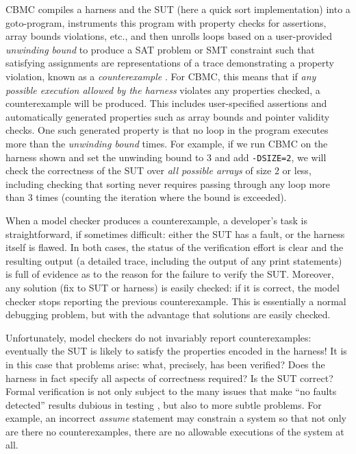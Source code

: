 \documentclass[conference]{IEEEtran}
\begin{document}
CBMC compiles a harness and the SUT (here a quick sort implementation)
into a goto-program, instruments this program with property checks for
assertions, array bounds violations, etc., and then unrolls loops
based on a user-provided \emph{unwinding bound} to produce a SAT
problem or SMT constraint such that satisfying assignments are
representations of a trace demonstrating a property violation, known
as a \emph{counterexample} \cite{CountWitness}.  For CBMC, this means
that if \emph{any possible execution allowed by the harness} violates
any properties checked, a counterexample will be produced.  This
includes user-specified assertions and automatically generated
properties such as array bounds and pointer validity checks. One such
generated property is that no loop in the program executes more than
the \emph{unwinding bound} times.  For example, if we run CBMC on the
harness shown and set the unwinding bound to 3 and add {\tt -DSIZE=2},
we will check the correctness of the SUT over \emph{all possible
  arrays} of size 2 or less, including checking that sorting never
requires passing through any loop more than 3 times (counting the
iteration where the bound is exceeded).

When a model checker produces a counterexample, a developer's task is
straightforward, if sometimes difficult: either the SUT has a fault,
or the harness itself is flawed.  In both cases, the status of the
verification effort is clear and the resulting output (a detailed
trace, including the output of any print statements) is full of
evidence as to the reason for the failure to verify the SUT. Moreover,
any solution (fix to SUT or harness) is easily checked: if it is
correct, the model checker stops reporting the previous
counterexample.  This is essentially a normal debugging problem, but
with the advantage that solutions are easily checked.

Unfortunately, model checkers do not invariably report
counterexamples: eventually the SUT is likely to satisfy the
properties encoded in the harness!  It is in this case that problems
arise: what, precisely, has been verified?  Does the harness in fact
specify all aspects of correctness required?  Is the SUT correct?
Formal verification is not only subject to the many issues that make
``no faults detected'' results dubious in testing \cite{WODA09,CovDisc}, but
also to more subtle problems.  For example, an incorrect \emph{assume}
statement may constrain a system so that not only are there no
counterexamples, there are no allowable executions of the system at
all.
\end{document}
